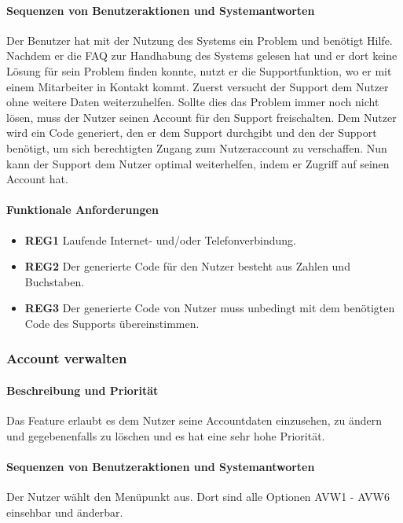 \paragraph{Sequenzen von Benutzeraktionen und Systemantworten}
Der Benutzer hat mit der Nutzung des Systems ein Problem und benötigt Hilfe.
Nachdem er die FAQ zur Handhabung des Systems gelesen hat und er dort keine Lösung für sein Problem finden konnte,
nutzt er die Supportfunktion, wo er mit einem Mitarbeiter in Kontakt kommt.
Zuerst versucht der Support dem Nutzer ohne weitere Daten weiterzuhelfen.
Sollte dies das Problem immer noch nicht lösen, muss der Nutzer seinen Account für den Support freischalten.
Dem Nutzer wird ein Code generiert, den er dem Support durchgibt und den der Support benötigt,
um sich berechtigten Zugang zum Nutzeraccount zu verschaffen.
Nun kann der Support dem Nutzer optimal weiterhelfen, indem er Zugriff auf seinen Account hat.
\paragraph{Funktionale Anforderungen}
\begin{itemize}
	\item \textbf{REG1} Laufende Internet- und/oder Telefonverbindung.
	\item \textbf{REG2} Der generierte Code für den Nutzer besteht aus Zahlen und Buchstaben.
	\item \textbf{REG3} Der generierte Code von Nutzer muss unbedingt mit dem benötigten Code des Supports übereinstimmen.

\end{itemize}


\subsubsection{Account verwalten}
\paragraph{Beschreibung und Priorität}
Das Feature erlaubt es dem Nutzer seine Accountdaten einzusehen, zu ändern und gegebenenfalls zu löschen
und es hat eine sehr hohe Priorität.

\paragraph{Sequenzen von Benutzeraktionen und Systemantworten}
Der Nutzer wählt den Menüpunkt  aus.
Dort sind alle Optionen AVW1 - AVW6 einsehbar und änderbar.

